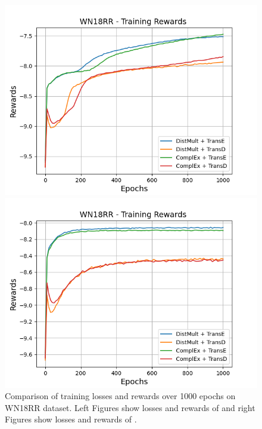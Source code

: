 \begin{figure}[H]
\begin{minipage}{.5\textwidth}
    \end{minipage}
    \begin{minipage}{.5\textwidth}
      \centering
      \includegraphics[width=0.9\linewidth]{figures/results/gan_train/not_pretrained/random/wn18rr/epochs1000/random_wn18rr_rew.png}
    \end{minipage}%
    \begin{minipage}{.5\textwidth}
      \centering
      \includegraphics[width=0.9\linewidth]{figures/results/gan_train/not_pretrained/uncertainty/max_distribution/entropy/wn18rr/1k_epochs/uncertainty_wn18rr_rew.png}
    \end{minipage}%
    \caption{Comparison of training losses and rewards over 1000 epochs on \textsc{WN18RR} dataset.
    Left Figures show losses and rewards of \origsampling and right Figures show losses and rewards of \ussoftmax.}
    \label{fig:advtrain_wn18rr_losses_rewards}
\end{figure}